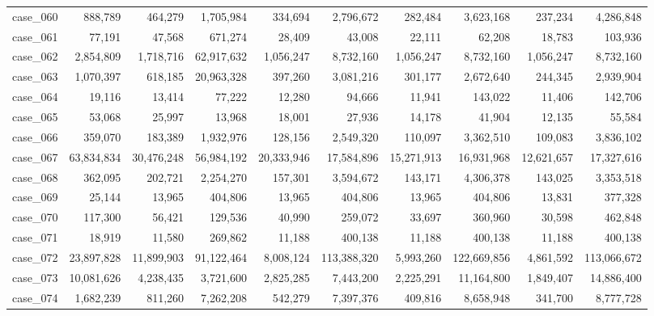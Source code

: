 \begin{footnotesize}
\begin{longtable}{l r rr rr rr rr}
case\_060 & 888{,}789 & 464{,}279 & 1{,}705{,}984 & 334{,}694 & 2{,}796{,}672 & 282{,}484 & 3{,}623{,}168 & 237{,}234 & 4{,}286{,}848 \\
case\_061 & 77{,}191 & 47{,}568 & 671{,}274 & 28{,}409 & 43{,}008 & 22{,}111 & 62{,}208 & 18{,}783 & 103{,}936 \\
case\_062 & 2{,}854{,}809 & 1{,}718{,}716 & 62{,}917{,}632 & 1{,}056{,}247 & 8{,}732{,}160 & 1{,}056{,}247 & 8{,}732{,}160 & 1{,}056{,}247 & 8{,}732{,}160 \\
case\_063 & 1{,}070{,}397 & 618{,}185 & 20{,}963{,}328 & 397{,}260 & 3{,}081{,}216 & 301{,}177 & 2{,}672{,}640 & 244{,}345 & 2{,}939{,}904 \\
case\_064 & 19{,}116 & 13{,}414 & 77{,}222 & 12{,}280 & 94{,}666 & 11{,}941 & 143{,}022 & 11{,}406 & 142{,}706 \\
case\_065 & 53{,}068 & 25{,}997 & 13{,}968 & 18{,}001 & 27{,}936 & 14{,}178 & 41{,}904 & 12{,}135 & 55{,}584 \\
case\_066 & 359{,}070 & 183{,}389 & 1{,}932{,}976 & 128{,}156 & 2{,}549{,}320 & 110{,}097 & 3{,}362{,}510 & 109{,}083 & 3{,}836{,}102 \\
case\_067 & 63{,}834{,}834 & 30{,}476{,}248 & 56{,}984{,}192 & 20{,}333{,}946 & 17{,}584{,}896 & 15{,}271{,}913 & 16{,}931{,}968 & 12{,}621{,}657 & 17{,}327{,}616 \\
case\_068 & 362{,}095 & 202{,}721 & 2{,}254{,}270 & 157{,}301 & 3{,}594{,}672 & 143{,}171 & 4{,}306{,}378 & 143{,}025 & 3{,}353{,}518 \\
case\_069 & 25{,}144 & 13{,}965 & 404{,}806 & 13{,}965 & 404{,}806 & 13{,}965 & 404{,}806 & 13{,}831 & 377{,}328 \\
case\_070 & 117{,}300 & 56{,}421 & 129{,}536 & 40{,}990 & 259{,}072 & 33{,}697 & 360{,}960 & 30{,}598 & 462{,}848 \\
case\_071 & 18{,}919 & 11{,}580 & 269{,}862 & 11{,}188 & 400{,}138 & 11{,}188 & 400{,}138 & 11{,}188 & 400{,}138 \\
case\_072 & 23{,}897{,}828 & 11{,}899{,}903 & 91{,}122{,}464 & 8{,}008{,}124 & 113{,}388{,}320 & 5{,}993{,}260 & 122{,}669{,}856 & 4{,}861{,}592 & 113{,}066{,}672 \\
case\_073 & 10{,}081{,}626 & 4{,}238{,}435 & 3{,}721{,}600 & 2{,}825{,}285 & 7{,}443{,}200 & 2{,}225{,}291 & 11{,}164{,}800 & 1{,}849{,}407 & 14{,}886{,}400 \\
case\_074 & 1{,}682{,}239 & 811{,}260 & 7{,}262{,}208 & 542{,}279 & 7{,}397{,}376 & 409{,}816 & 8{,}658{,}948 & 341{,}700 & 8{,}777{,}728 \\

\end{longtable}
\end{footnotesize}
